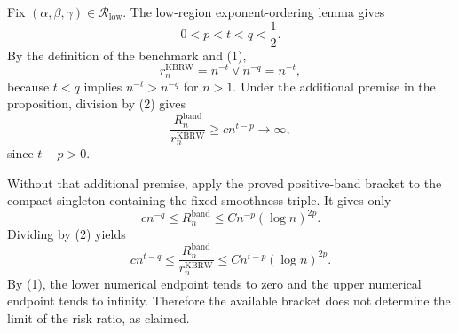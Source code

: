 Fix \((\alpha,\beta,\gamma)\in\mathcal R_{\mathrm{low}}\).  The low-region exponent-ordering lemma gives
\[
0<p<t<q<\frac12.
\tag{1}
\]
By the definition of the benchmark and (1),
\[
r_n^{\mathrm{KBRW}}=n^{-t}\vee n^{-q}=n^{-t},
\tag{2}
\]
because \(t<q\) implies \(n^{-t}>n^{-q}\) for \(n>1\).  Under the additional premise in the proposition, division by (2) gives
\[
\frac{R_n^{\mathrm{band}}}{r_n^{\mathrm{KBRW}}}
\ge cn^{t-p}\longrightarrow\infty,
\]
since \(t-p>0\).

Without that additional premise, apply the proved positive-band bracket to the compact singleton containing the fixed smoothness triple.  It gives only
\[
cn^{-q}\le R_n^{\mathrm{band}}
\le Cn^{-p}(\log n)^{2p}.
\]
Dividing by (2) yields
\[
cn^{t-q}\le
\frac{R_n^{\mathrm{band}}}{r_n^{\mathrm{KBRW}}}
\le Cn^{t-p}(\log n)^{2p}.
\]
By (1), the lower numerical endpoint tends to zero and the upper numerical endpoint tends to infinity.  Therefore the available bracket does not determine the limit of the risk ratio, as claimed.